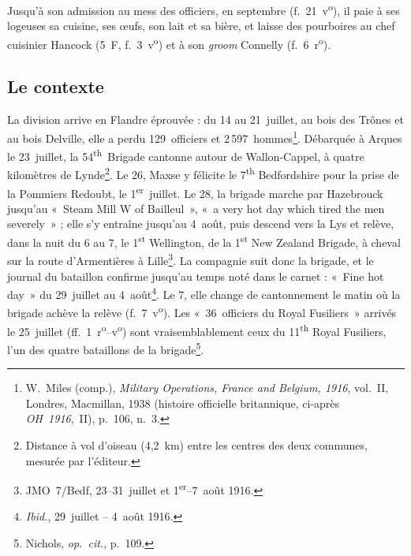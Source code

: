 Jusqu'à son admission au mess des officiers, en septembre (f.~21~v\textsuperscript{o}), il paie à ses logeuses sa cuisine, ses œufs, son lait et sa bière, et laisse des pourboires au chef cuisinier Hancock (5~F, f.~3~v\textsuperscript{o}) et à son \textit{groom} Connelly (f.~6~r\textsuperscript{o}).

\subsection*{Le contexte}

La division arrive en Flandre éprouvée : du 14 au 21~juillet, au bois des Trônes et au bois Delville, elle a perdu 129~officiers et 2\,597~hommes\footnote{W.~Miles (comp.), \textit{Military Operations, France and Belgium, 1916}, vol.~II, Londres, Macmillan, 1938 (histoire officielle britannique, ci-après \textit{OH~1916},~II), p.~106, n.~3.}. Débarquée à Arques le 23~juillet, la 54\textsuperscript{th}~Brigade cantonne autour de Wallon-Cappel, à quatre kilomètres de Lynde\footnote{Distance à vol d'oiseau (4,2~km) entre les centres des deux communes, mesurée par l'éditeur.}. Le 26, Maxse y félicite le 7\textsuperscript{th} Bedfordshire pour la prise de la Pommiers Redoubt, le 1\textsuperscript{er}~juillet. Le 28, la brigade marche par Hazebrouck jusqu'au «~Steam Mill W of Bailleul~», «~a very hot day which tired the men severely~» ; elle s'y entraîne jusqu'au 4~août, puis descend vers la Lys et relève, dans la nuit du 6 au 7, le 1\textsuperscript{st} Wellington, de la 1\textsuperscript{st} New Zealand Brigade, à cheval sur la route d'Armentières à Lille\footnote{JMO~7/Bedf, 23--31~juillet et 1\textsuperscript{er}--7~août 1916.}. La compagnie suit donc la brigade, et le journal du bataillon confirme jusqu'au temps noté dans le carnet : «~Fine hot day~» du 29~juillet au 4~août\footnote{\textit{Ibid.}, 29~juillet -- 4~août 1916.}. Le 7, elle change de cantonnement le matin où la brigade achève la relève (f.~7~v\textsuperscript{o}). Les «~36~officiers du Royal Fusiliers~» arrivés le 25~juillet (ff.~1~r\textsuperscript{o}--v\textsuperscript{o}) sont vraisemblablement ceux du 11\textsuperscript{th} Royal Fusiliers, l'un des quatre bataillons de la brigade\footnote{Nichols, \textit{op.~cit.}, p.~109.}.

